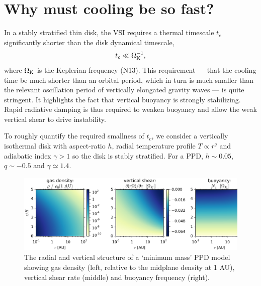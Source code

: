 \documentclass[iop, numberedappendix]{emulateapj}
\def \OmK {\Omega_{\rm K}}
\begin{document}
\section{Why must cooling be so fast?}\label{vsi_require}     
In a stably stratified thin disk, the VSI  
requires a thermal timescale $t_c$ significantly shorter than the
disk dynamical timescale, 
\begin{align}
  t _c \ll \OmK^{-1},
\end{align}
where $\OmK$ is the Keplerian frequency (N13).    
This requirement --- that the cooling time be much shorter than an orbital period, 
which in turn is much smaller than the relevant oscillation period of vertically elongated gravity waves  --- is quite stringent.
It highlights the fact that vertical buoyancy is strongly 
stabilizing. Rapid radiative damping is thus required to weaken
buoyancy and allow the weak vertical shear to drive instability.   

To roughly quantify the required smallness of $t_c$, we consider a
vertically isothermal disk with aspect-ratio $ h$, 
 radial temperature profile $T \propto r^q$ and adiabatic index
$\gamma>1$ so the disk is stably stratified.  For a PPD, $ h \sim 0.05$,
$q\sim -0.5$ and $\gamma\simeq 1.4$.  

\begin{figure}
  \includegraphics[width=\linewidth]{figures/rhoshearNz}
  \caption{The radial and vertical structure of a `minimum mass' PPD model showing gas density (left, relative to the midplane density at 1 AU), vertical shear rate (middle) and
    buoyancy frequency (right).
    \label{eqm_structure} 
  }
\end{figure}
\end{document}
